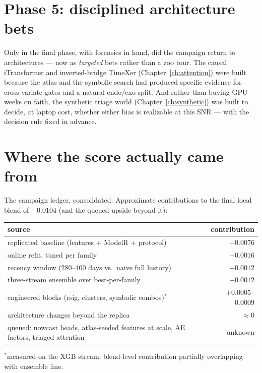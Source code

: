 \section{Phase 5: disciplined architecture bets}

Only in the final phase, with forensics in hand, did the campaign return
to architectures --- now as \emph{targeted} bets rather than a zoo tour.
The causal iTransformer and inverted-bridge TimeXer
(Chapter~\ref{ch:attention}) were built because the atlas and the
symbolic search had produced specific evidence for cross-variate gates
and a natural endo/exo split. And rather than buying GPU-weeks on faith,
the synthetic triage world (Chapter~\ref{ch:synthetic}) was built to
decide, at laptop cost, whether either bias is realizable at this SNR
--- with the decision rule fixed in advance.

\section{Where the score actually came from}

The campaign ledger, consolidated. Approximate contributions to the final
local blend of $+0.0104$ (and the queued upside beyond it):

\begin{center}
\small
\begin{tabularx}{\textwidth}{@{}>{\raggedright\arraybackslash}Xr@{}}
\toprule
source & contribution \\
\midrule
replicated baseline (features + ModelR + protocol) & $+0.0076$ \\
online refit, tuned per family & $+0.0016$ \\
recency window (280--400 days vs.\ naive full history) & $+0.0012$ \\
three-stream ensemble over best-per-family & $+0.0012$ \\
engineered blocks (rsig, clusters, symbolic combos)$^{\ast}$ &
$+0.0005$--$0.0009$ \\
architecture changes beyond the replica & $\approx 0$ \\
\midrule
queued: nowcast heads, atlas-seeded features at scale, AE factors,
triaged attention & unknown \\
\bottomrule
\end{tabularx}
\end{center}
{\footnotesize $^{\ast}$measured on the XGB stream; blend-level
contribution partially overlapping with ensemble line.}

